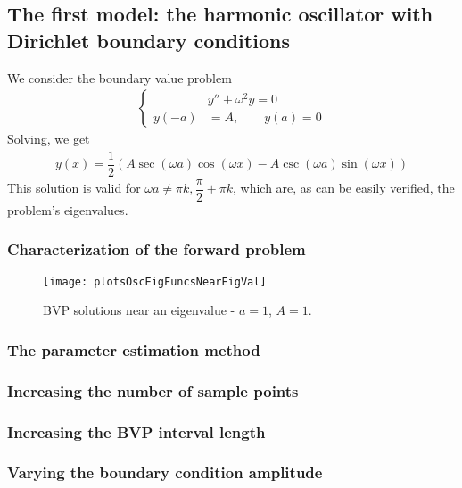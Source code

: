 \documentclass[12pt,twoside]{article}
\begin{document}
\subsection{The first model: the harmonic oscillator with Dirichlet boundary conditions}
We consider the boundary value problem
\begin{align}
\label{eqns:}
\begin{cases}
&y'' + \omega^2 y =0 \\
y(-a) &= A, \qquad y(a) = 0
\end{cases}
\end{align}
Solving, we get 
\begin{align}
y(x) = \dfrac{1}{2} (A \sec (\omega a ) \cos (\omega x)-A \csc ( \omega a ) \sin ( \omega x))
\end{align}
This solution is valid for $\omega a \neq \pi k, \dfrac{\pi}{2}+ \pi k$, which are, as can be easily verified, the problem's eigenvalues.
 


\subsubsection{Characterization of the forward problem }
\begin{figure} 
\begin{center}
\texttt{[image: plotsOscEigFuncsNearEigVal]}
\end{center}
\caption {BVP solutions near an eigenvalue - $a = 1$, $A=1$. }

\label{fig:plotsOscEigFuncsNearEigVal}
\end{figure}

\subsubsection{The parameter estimation method}

\subsubsection{Increasing the number of sample points}

\subsubsection{Increasing the BVP interval length}

\subsubsection{Varying the boundary condition amplitude}
\end{document}
